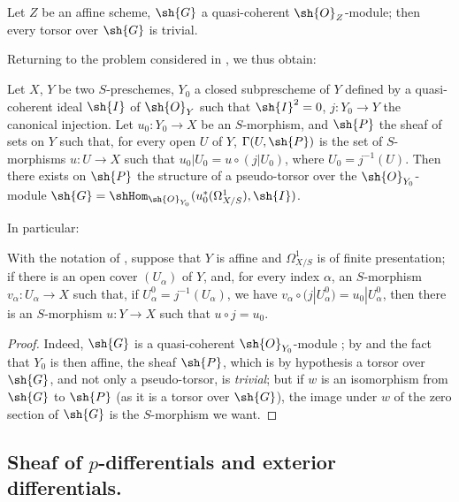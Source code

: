 \begin{proposition}[16.5.16]
\label{IV.16.5.16}
Let $Z$ be an affine scheme, $\sh{G}$ a quasi-coherent $\sh{O}_Z$-module;
then every torsor over $\sh{G}$ is trivial.
\end{proposition}

Returning to the problem considered in , we thus obtain:

\begin{proposition}[16.5.17]
\label{IV.16.5.17}
Let $X$, $Y$ be two $S$-preschemes, $Y_0$ a closed subprescheme of $Y$ defined by a quasi-coherent ideal $\sh{I}$ of $\sh{O}_Y$ such that $\sh{I}^2 = 0$, $j : Y_0 \to Y$ the canonical injection.
Let $u_0:Y_0 \to X$ be an $S$-morphism, and $\sh{P}$ the sheaf of sets on $Y$ such that, for every open $U$ of $Y$, $\Gamma(U, \sh{P})$ is the set of $S$-morphisms $u : U \to X$ such that $u_0|U_0 = u \circ (j|U_0)$, where $U_0 = j^{-1}(U)$.
Then there exists on $\sh{P}$ the structure of a pseudo-torsor over the $\sh{O}_{Y_0}$-module $\sh{G} = \shHom_{\sh{O}_{Y_0}}(u_0^*(\Omega_{X/S}^1), \sh{I})$.
\end{proposition}

In particular:

\begin{corollary}[16.5.18]
\label{IV.16.5.18}
With the notation of , suppose that $Y$ is affine and $\Omega_{X/S}^1$ is of finite presentation;
if there is an open cover $(U_\alpha)$ of $Y$, and, for every index $\alpha$, an $S$-morphism $v_\alpha : U_\alpha \to X$ such that, if $U_\alpha^0 = j^{-1}(U_\alpha)$, we have $v_\alpha \circ (j|U_\alpha^0) = u_0|U_\alpha^0$, then there is an $S$-morphism $u : Y \to X$ such that $u \circ j = u_0$.
\end{corollary}

\begin{proof}
Indeed, $\sh{G}$ is a quasi-coherent $\sh{O}_{Y_0}$-module ;
by  and the fact that $Y_0$ is then affine, the sheaf $\sh{P}$, which is by hypothesis a torsor over $\sh{G}$, and not only a pseudo-torsor, is \emph{trivial};
but if $w$ is an isomorphism from $\sh{G}$ to $\sh{P}$ (as it is a torsor over $\sh{G}$), the image under $w$ of the zero section of $\sh{G}$ is the $S$-morphism we want.
\end{proof}

\subsection{Sheaf of $p$-differentials and exterior differentials.}
\label{IV.16.6}

